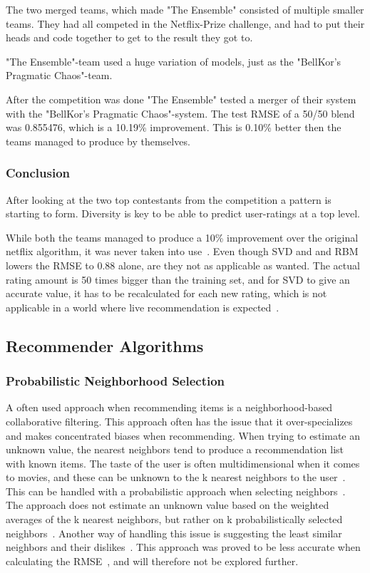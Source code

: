 The two merged teams, which made "The Ensemble" consisted of multiple smaller teams. They had all competed in the Netflix-Prize challenge, and had to put their heads and code together to get to the result they got to.

"The Ensemble"-team used a huge variation of models, just as the "BellKor's Pragmatic Chaos"-team.

After the competition was done "The Ensemble" tested a merger of their system with the "BellKor's Pragmatic Chaos"-system. The test RMSE of a 50/50 blend was 0.855476, which is a 10.19\% improvement. This is 0.10\% better then the teams managed to produce by themselves.

\subsubsection{Conclusion}
After looking at the two top contestants from the competition a pattern is starting to form. Diversity is key to be able to predict user-ratings at a top level.

While both the teams managed to produce a 10\% improvement over the original netflix algorithm, it was never taken into use~\cite{nfbeyond5}. Even though SVD and and RBM lowers the RMSE to 0.88 alone, are they not as applicable as wanted. The actual rating amount is 50 times bigger than the training set, and for SVD to give an accurate value, it has to be recalculated for each new rating, which is not applicable in a world where live recommendation is expected~\cite{nfbeyond5}.


\subsection{Recommender Algorithms}
\subsubsection{Probabilistic Neighborhood Selection}
A often used approach when recommending items is a neighborhood-based collaborative filtering. This approach often has the issue that it over-specializes and makes concentrated biases when recommending. When trying to estimate an unknown value, the nearest neighbors tend to produce a recommendation list with known items. The taste of the user is often multidimensional when it comes to movies, and these can be unknown to the k nearest neighbors to the user~\cite{umana}. This can be handled with a probabilistic approach when selecting neighbors~\cite{probcobfilter}. The approach does not estimate an unknown value based on the weighted averages of the k nearest neighbors, but rather on k probabilistically selected neighbors~\cite{optaplanner}. Another way of handling this issue is suggesting the least similar neighbors and their dislikes~\cite{furthestneighbor}. This approach was proved to be less accurate when calculating the RMSE~\cite{probcobfilter}, and will therefore not be explored further.


